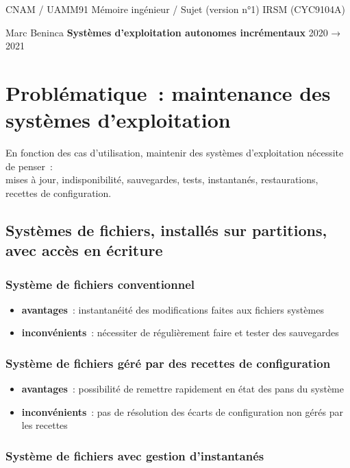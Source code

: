 \documentclass[10pt]{article}
\newenvironment{itmz}{\begin{itemize}
\setlength{\itemsep}{0em}
}{\end{itemize}}
\begin{document}
CNAM / UAMM91 \hfill Mémoire ingénieur / Sujet (version n°1) \hfill IRSM (CYC9104A)

Marc Beninca \hfill \textbf{Systèmes d’exploitation autonomes incrémentaux} \hfill 2020 → 2021

\section{Problématique : maintenance des systèmes d’exploitation}

En fonction des cas d’utilisation, maintenir des systèmes d’exploitation nécessite de penser :\\
mises à jour, indisponibilité, sauvegardes, tests, instantanés, restaurations, recettes de configuration.

\subsection{Systèmes de fichiers, installés sur partitions, avec accès en écriture}

\subsubsection{Système de fichiers conventionnel}

\begin{itmz}
\item{\textbf{avantages} : instantanéité des modifications faites aux fichiers systèmes}
\item{\textbf{inconvénients} : nécessiter de régulièrement faire et tester des sauvegardes}
\end{itmz}

\subsubsection{Système de fichiers géré par des recettes de configuration}

\begin{itmz}
\item{\textbf{avantages} : possibilité de remettre rapidement en état des pans du système}
\item{\textbf{inconvénients} : pas de résolution des écarts de configuration non gérés par les recettes}
\end{itmz}

\subsubsection{Système de fichiers avec gestion d’instantanés}
\end{document}
